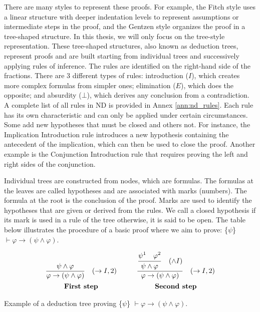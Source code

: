 There are many styles to represent these proofs. For example, the Fitch style uses a linear structure with deeper indentation levels to represent assumptions or intermediate steps in the proof, and the Gentzen style organizes the proof in a tree-shaped structure. In this thesis, we will only focus on the tree-style representation. These tree-shaped structures, also known as deduction trees, represent proofs and are built starting from individual trees and successively applying rules of inference. The rules are identified on the right-hand side of the fractions. There are 3 different types of rules: introduction (\(I\)), which creates more complex formulas from simpler ones; elimination (\(E\)), which does the opposite; and absurdity (\(\bot\)), which derives any conclusion from a contradiction. A complete list of all rules in \gls{ND} is provided in Annex \ref{ann:nd_rules}. Each rule has its own characteristic and can only be applied under certain circumstances. Some add new hypotheses that must be closed and others not. For instance, the Implication Introduction rule introduces a new hypothesis containing the antecedent of the implication, which can then be used to close the proof. Another example is the Conjunction Introduction rule that requires proving the left and right sides of the conjunction.

Individual trees are constructed from nodes, which are formulas. The formulas at the leaves are called hypotheses and are associated with marks (numbers). The formula at the root is the conclusion of the proof. Marks are used to identify the hypotheses that are given or derived from the rules. We call a closed hypothesis if its mark is used in a rule of the tree otherwise, it is said to be open. The table below illustrates the procedure of a basic proof where we aim to prove: \{\(\psi\)\} \( \vdash \varphi \to (\psi \land \varphi) \).

\begin{table}[h!]
    \[
    \begin{array}{c@{\hspace{1cm}}c}
            \frac{\displaystyle \psi \land \varphi\strut}{\displaystyle \varphi \to (\psi \land \varphi)\strut} \quad (\to I, 2) &
            \frac{\displaystyle\frac{\displaystyle \psi^1 \quad \varphi^2\strut}{\displaystyle \psi \land \varphi\strut}\quad (\land I)\strut}{\displaystyle \varphi \to (\psi \land \varphi)\strut} \quad (\to I, 2)\\[10pt]
            \textbf{First step} & \textbf{Second step} \\
    \end{array}
      \]
    \caption{Example of a deduction tree proving \{\(\psi\)\} \( \vdash \varphi \to (\psi \land \varphi) \).}
    \label{tab:proof-tree-part2}
\end{table}

